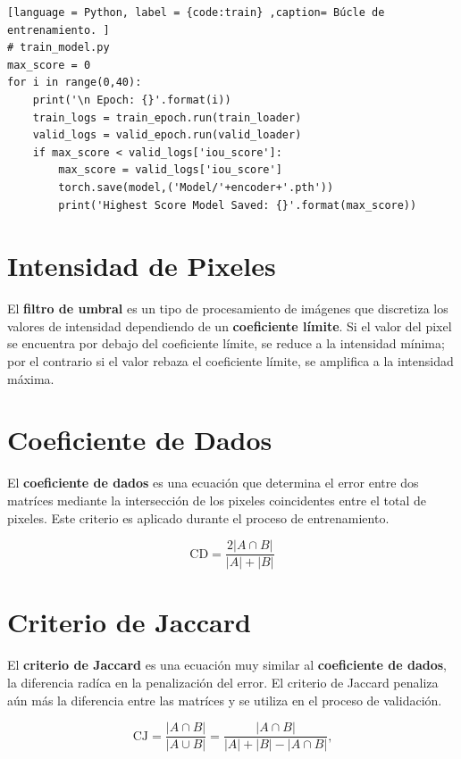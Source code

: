 \documentclass[a0,portrait]{a0poster}
\begin{document}
\begin{multicols}{3}
\lstset{style=pystyle}

\begin{lstlisting}[language = Python, label = {code:train} ,caption= Búcle de entrenamiento. ]
# train_model.py
max_score = 0 
for i in range(0,40):
    print('\n Epoch: {}'.format(i))
    train_logs = train_epoch.run(train_loader)
    valid_logs = valid_epoch.run(valid_loader)
    if max_score < valid_logs['iou_score']:
        max_score = valid_logs['iou_score']
        torch.save(model,('Model/'+encoder+'.pth'))
        print('Highest Score Model Saved: {}'.format(max_score))
\end{lstlisting}

\section*{Intensidad de Pixeles}
El \textbf{filtro de umbral} es un tipo de procesamiento de imágenes que discretiza los valores de intensidad dependiendo de un \textbf{coeficiente límite}. Si el valor del pixel se encuentra por debajo del coeficiente límite, se reduce a la intensidad mínima; por el contrario si el valor rebaza el coeficiente límite, se amplifica a la intensidad máxima.

\section*{Coeficiente de Dados}
El \textbf{coeficiente de dados} es una ecuación que determina el error entre dos matríces mediante la intersección de los pixeles coincidentes entre el total de pixeles. Este criterio es aplicado durante el proceso de entrenamiento.

\begin{center}
    \begin{equation}
        \text{CD} = \frac{2|A \cap B |}{|A| + |B|}
    \end{equation}        
\end{center}

\section*{Criterio de Jaccard}
El \textbf{criterio de Jaccard} es una ecuación muy similar al \textbf{coeficiente de dados}, la diferencia radíca en la penalización del error. El criterio de Jaccard penaliza aún más la diferencia entre las matríces y se utiliza en el proceso de validación.

\begin{equation}\label{eq:jacc}
    \text{CJ} = \frac{|A \cap B|}{| A \cup B |} = \frac{|A \cap B|}{|A| + |B| - |A \cap B|} \text{,}
\end{equation}


\end{multicols}
\end{document}
